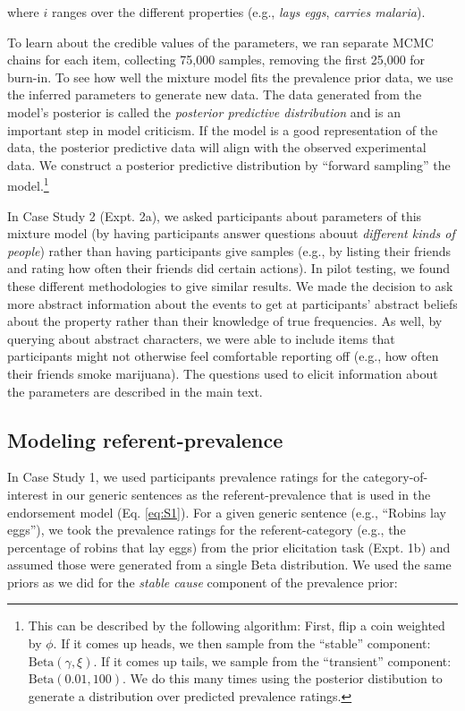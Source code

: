 \documentclass[english,floatsintext,man]{apa6}
\theoremstyle{definition}
\theoremstyle{definition}
\theoremstyle{definition}
\theoremstyle{remark}
\begin{document}
where \(i\) ranges over the different properties (e.g., \emph{lays
eggs}, \emph{carries malaria}).

To learn about the credible values of the parameters, we ran separate
MCMC chains for each item, collecting 75,000 samples, removing the first
25,000 for burn-in. To see how well the mixture model fits the
prevalence prior data, we use the inferred parameters to generate new
data. The data generated from the model's posterior is called the
\emph{posterior predictive distribution} and is an important step in
model criticism. If the model is a good representation of the data, the
posterior predictive data will align with the observed experimental
data. We construct a posterior predictive distribution by
\enquote{forward sampling} the model.\footnote{This can be described by
  the following algorithm: First, flip a coin weighted by \(\phi\). If
  it comes up heads, we then sample from the \enquote{stable} component:
  \(\text{Beta}(\gamma, \xi)\). If it comes up tails, we sample from the
  \enquote{transient} component: \(\text{Beta}(0.01, 100)\). We do this
  many times using the posterior distibution to generate a distribution
  over predicted prevalence ratings.}

In Case Study 2 (Expt. 2a), we asked participants about parameters of
this mixture model (by having participants answer questions abouut
\emph{different kinds of people}) rather than having participants give
samples (e.g., by listing their friends and rating how often their
friends did certain actions). In pilot testing, we found these different
methodologies to give similar results. We made the decision to ask more
abstract information about the events to get at participants' abstract
beliefs about the property rather than their knowledge of true
frequencies. As well, by querying about abstract characters, we were
able to include items that participants might not otherwise feel
comfortable reporting off (e.g., how often their friends smoke
marijuana). The questions used to elicit information about the
parameters are described in the main text.

\subsection{Modeling
referent-prevalence}\label{modeling-referent-prevalence}

In Case Study 1, we used participants prevalence ratings for the
category-of-interest in our generic sentences as the referent-prevalence
that is used in the endorsement model (Eq. \ref{eq:S1}). For a given
generic sentence (e.g., \enquote{Robins lay eggs}), we took the
prevalence ratings for the referent-category (e.g., the percentage of
robins that lay eggs) from the prior elicitation task (Expt. 1b) and
assumed those were generated from a single Beta distribution. We used
the same priors as we did for the \emph{stable cause} component of the
prevalence prior:
\end{document}
